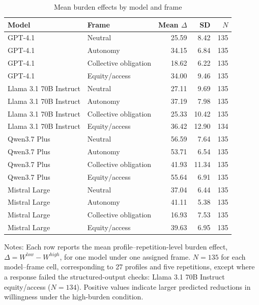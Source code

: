 \begin{table}[htbp]
\centering
\caption{Mean burden effects by model and frame}
\label{tab:h3_model_frame_means}
\small
\begin{tabular}{L{3.2cm}L{3.1cm}rrr}
\toprule
Model & Frame & Mean \(\Delta\) & SD & \(N\) \\
\midrule
GPT-4.1 & Neutral & 25.59 & 8.42 & 135 \\
GPT-4.1 & Autonomy & 34.15 & 6.84 & 135 \\
GPT-4.1 & Collective obligation & 18.62 & 6.22 & 135 \\
GPT-4.1 & Equity/access & 34.00 & 9.46 & 135 \\
\midrule
Llama 3.1 70B Instruct & Neutral & 27.11 & 9.69 & 135 \\
Llama 3.1 70B Instruct & Autonomy & 37.19 & 7.98 & 135 \\
Llama 3.1 70B Instruct & Collective obligation & 25.33 & 10.42 & 135 \\
Llama 3.1 70B Instruct & Equity/access & 36.42 & 12.90 & 134 \\
\midrule
Qwen3.7 Plus & Neutral & 56.59 & 7.64 & 135 \\
Qwen3.7 Plus & Autonomy & 53.71 & 6.54 & 135 \\
Qwen3.7 Plus & Collective obligation & 41.93 & 11.34 & 135 \\
Qwen3.7 Plus & Equity/access & 55.64 & 6.91 & 135 \\
\midrule
Mistral Large & Neutral & 37.04 & 6.44 & 135 \\
Mistral Large & Autonomy & 41.11 & 5.38 & 135 \\
Mistral Large & Collective obligation & 16.93 & 7.53 & 135 \\
Mistral Large & Equity/access & 39.63 & 6.95 & 135 \\
\bottomrule
\end{tabular}
\begin{flushleft}
\footnotesize Notes: Each row reports the mean profile--repetition-level burden effect, \(\Delta = W^{low}-W^{high}\), for one model under one assigned frame. $N=135$ for each model--frame cell, corresponding to 27 profiles and five repetitions, except where a response failed the structured-output checks: Llama 3.1 70B Instruct equity/access ($N=134$). Positive values indicate larger predicted reductions in willingness under the high-burden condition.
\end{flushleft}
\end{table}


